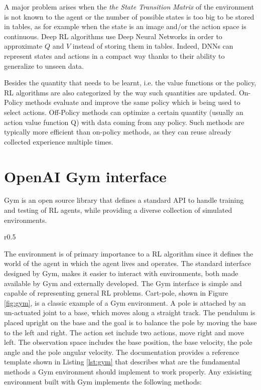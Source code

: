 A major problem arises when the \textit{the State Transition Matrix} of the environment is not known to the agent or the number of possible states is too big to be stored in tables, as for example when the state is an image and/or the action space is continuous. Deep RL algorithms use Deep Neural Networks in order to approximate $Q$ and $V$ instead of storing them in tables. Indeed, DNNs can represent states and actions in a compact way thanks to their ability to generalize to unseen data. 

Besides the quantity that needs to be learnt, i.e. the value functions or the policy, RL algorithms are also categorized by the way such quantities are updated. On-Policy methods evaluate and improve the same policy which is being used to select actions. Off-Policy methods can optimize a certain quantity (usually an action value function Q) with data coming from any policy. Such methods are typically more efficient than on-policy methods, as they can reuse already collected experience multiple times.

\section{OpenAI Gym interface}

Gym is an open source library that defines a standard API to handle training and testing of RL agents, while providing a diverse collection of simulated environments.

\begin{wrapfigure}{r}{0.5\textwidth}
  \begin{center}
  \end{center}
  \caption{Cart-pole in Gym}
  \label{fig:gym}
\end{wrapfigure}
The environment is of primary importance to a RL algorithm since it defines the world of the agent in which the agent lives and operates. The standard interface designed by Gym, makes it easier to interact with environments, both made available by Gym and externally developed.
The Gym interface is simple and capable of representing general RL problems. Cart-pole, shown in Figure \ref{fig:gym}, is a classic example of a Gym environment. A pole is attached by an un-actuated joint to a base, which moves along a straight track. The pendulum is placed upright on the base and the goal is to balance the pole by moving the base to the left and right. The action set include two actions, move right and move left. The observation space includes the base position, the base velocity, the pole angle and the pole angular velocity.
The documentation provides a reference template shown in Listing \ref{lst:gym} that describes what are the fundamental methods a Gym environment should implement to work properly.
Any exisisting environment built with Gym implements the following methods:

